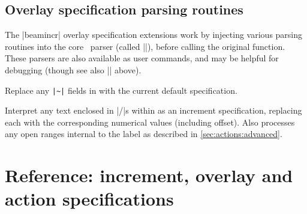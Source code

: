 \documentclass[a4paper]{ltxdoc}
\begin{document}
\begin{gather<>}
\subsection{Overlay specification parsing routines}

The |beamincr| overlay specification extensions work by injecting various
parsing routines into the core \beamer\ parser (called |\beamer@masterdecode|),
before calling the original function.  These parsers are also available as user
commands, and may be helpful for debugging (though see also |\beamincrdebug|
above).  

\begin{command}{\parsedefincspec {}}
  Replace any \texttt{|\~{}|} fields in  with the current
  default specification.
\end{command}
  
\begin{command}{\parseincrspec {}}
  Interpret any text enclosed in |/|s within  as an increment
  specification, replacing each with the corresponding numerical values
  (including offset).  Also processes any open ranges internal to the label as
  described in \cref{sec:actions:advanced}.
\end{command}

\begin{command}{\parseresetspec {}}
\end{command}

\begin{command}{\parselabelspec {}}
\end{command}



\newpage
\section{Reference: increment, overlay and action specifications}


{%
\def\meta#1{$\langle${\rmfamily\itshape#1}$\rangle$}
\def\ometa#1{\opt{\meta{#1}}}
\def\offset{\opt{\meta{offset}}}
\def\ooffset{\opt{\tt(\meta{offset})}}
\def\poffset{\opt{+\meta{offset}}}
\def\|{\kern3pt\vrule width0.4pt height1.9ex depth0.9ex\kern3pt}%
\def\spec#1&{\multicolumn2l{\hskip2.5em \tt #1}&}

\setlength{\extrarowheight}{1ex}

\begin{tabularx}{\textwidth}{>{\tt}l c X}


\end{tabularx}}
\end{gather<>}
\end{document}
